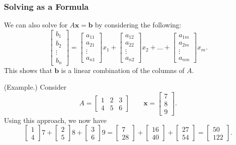 \documentclass[letterpaper]{article}
\newcommand{\0}{\mathbf{0}}
\begin{document}
\subsubsection{Solving as a Formula}
We can also solve for $A\mathbf{x} = \mathbf{b}$ by considering the following:
\[\begin{bmatrix}
    b_1 \\ b_2 \\ \vdots \\ b_n 
\end{bmatrix} = \begin{bmatrix}
    a_{11} \\ a_{21} \\ \vdots \\ a_{n1}
\end{bmatrix} x_1 + \begin{bmatrix}
    a_{12} \\ a_{22} \\ \vdots \\ a_{n2}
\end{bmatrix} x_2 + \hdots + \begin{bmatrix}
    a_{1m} \\ a_{2m} \\ \vdots \\ a_{nm}
\end{bmatrix} x_m.\]
This shows that $\mathbf{b}$ is a linear combination of the columns of $A$. 

\begin{mdframed}
    (Example.) Consider
    \[A = \begin{bmatrix}
        1 & 2 & 3 \\ 
        4 & 5 & 6
    \end{bmatrix} \qquad \mathbf{x} = \begin{bmatrix}
        7 \\ 8 \\ 9
    \end{bmatrix}.\]
    Using this approach, we now have 
    \[\begin{bmatrix}
        1 \\ 4
    \end{bmatrix} 7 + \begin{bmatrix}
        2 \\ 5
    \end{bmatrix} 8 + \begin{bmatrix}
        3 \\ 6
    \end{bmatrix} 9 = \begin{bmatrix}
        7 \\ 28
    \end{bmatrix} + \begin{bmatrix}
        16 \\ 40
    \end{bmatrix} + \begin{bmatrix}
        27 \\ 54
    \end{bmatrix} = \begin{bmatrix}
        50 \\ 122
    \end{bmatrix}.\]
\end{mdframed}
\end{document}
